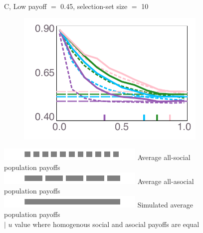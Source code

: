\documentclass[letterpaper,11.5pt]{scrartcl}
\begin{document}
\begin{figure}
\begin{subfigure}[]{0.4\textwidth}
    \end{subfigure} \\
    {\textsf C, Low payoff $=$ 0.45, selection-set size $=$ 10} \\
    \begin{subfigure}[]{0.4\textwidth}
      \centering
      \includegraphics[width=\textwidth]{Figures/mean_prev_net_payoff_over_u_lowpayoff=0.45_nbehaviors=10.pdf}
    \end{subfigure}

    \begin{center}
       \includegraphics[width=.75in]{Figures/legendElements/dot.pdf}
       { Average all-social population payoffs}  \\[.725em]
       \includegraphics[width=.75in]{Figures/legendElements/ldash.pdf} 
       { Average all-asocial population payoffs} \\[.725em]
       \includegraphics[width=.75in]{Figures/legendElements/solid.pdf} 
       { Simulated average population payoffs} \\[.725em]
       { $\pmb{|}$  \quad $u$ value where homogenous social and asocial payoffs
      are equal} 
    \end{center}
\end{figure}
\end{document}
